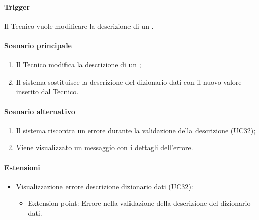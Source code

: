 \paragraph*{Trigger}
Il Tecnico vuole modificare la descrizione di un .

\paragraph*{Scenario principale}
\begin{enumerate}
  \item Il Tecnico modifica la descrizione di un ;
  \item Il sistema sostituisce la descrizione del dizionario dati con il nuovo valore inserito dal Tecnico.
\end{enumerate}

\paragraph*{Scenario alternativo}
\begin{enumerate}
  \item Il sistema riscontra un errore durante la validazione della descrizione (\hyperref[UC32]{UC32});
  \item Viene visualizzato un messaggio con i dettagli dell'errore.
\end{enumerate}

\paragraph*{Estensioni}
\begin{itemize}
  \item Visualizzazione errore descrizione dizionario dati (\hyperref[UC32]{UC32}):
  \begin{itemize}
    \item Extension point: Errore nella validazione della descrizione del dizionario dati.
  \end{itemize}
\end{itemize}